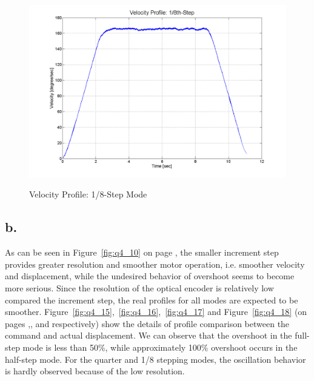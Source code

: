 \documentclass{article}
\theoremstyle{plain}
\theoremstyle{definition}
\theoremstyle{remark}
\begin{document}
\begin{figure}[h!]
\begin{center}
\includegraphics[width=12cm]{Q4_eighth_step.png}
\caption{Velocity Profile: 1/8-Step Mode} \label{tex}
\label{fig:q4_14}
\end{center}
\end{figure}

\clearpage

\subsection*{b.}

As can be seen in Figure~\ref{fig:q4_10} on page \pageref{fig:q4_10}, the smaller increment step provides greater resolution and smoother motor operation, i.e. smoother velocity and displacement, while the undesired behavior of overshoot seems to become more serious. Since the resolution of the optical encoder is relatively low compared the increment step, the real profiles for all modes are expected to be smoother. Figure~\ref{fig:q4_15},~\ref{fig:q4_16},~\ref{fig:q4_17} and Figure~\ref{fig:q4_18} (on pages \pageref{fig:q4_15},\pageref{fig:q4_16},\pageref{fig:q4_17} and \pageref{fig:q4_18} respectively) show the details of profile comparison between the command and actual displacement. We can observe that the overshoot in the full-step mode is less than 50\%, while approximately 100\% overshoot occurs in the half-step mode. For the quarter and 1/8 stepping modes, the oscillation behavior is hardly observed because of the low resolution. \\
\end{document}
